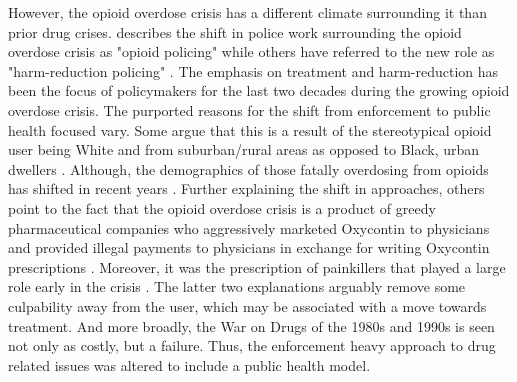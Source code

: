 However, the opioid overdose crisis has a different climate surrounding it than prior drug crises. \textcite{fedders_opioid_2019} describes the shift in police work surrounding the opioid overdose crisis as "opioid policing" while others have referred to the new role as "harm-reduction policing" \parencite{beckett_uses_2016}. The emphasis on treatment and harm-reduction has been the focus of policymakers for the last two decades during the growing opioid overdose crisis. The purported reasons for the shift from enforcement to public health focused vary. Some argue that this is a result of the stereotypical opioid user being White and from suburban/rural areas as opposed to Black, urban dwellers \parencite{hart_opioid_2019}. Although, the demographics of those fatally overdosing from opioids has shifted in recent years \parencite{humphreys_responding_2022}. Further explaining the shift in approaches, others point to the fact that the opioid overdose crisis is a product of greedy pharmaceutical companies who aggressively marketed Oxycontin to physicians and provided illegal payments to physicians in exchange for writing Oxycontin prescriptions \parencite{hoffman_purdue_2020}. Moreover, it was the prescription of painkillers that played a large role early in the crisis \parencite{dasgupta_opioid_2018}. The latter two explanations arguably remove some culpability away from the user, which may be associated with a move towards treatment. And more broadly, the War on Drugs of the 1980s and 1990s is seen not only as costly, but a failure. Thus, the enforcement heavy approach to drug related issues was altered to include a public health model. 


